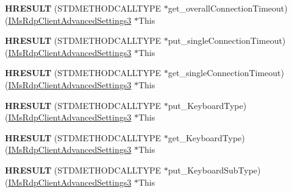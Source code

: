 \begin{DoxyCompactItemize}
{\bfseries H\+R\+E\+S\+U\+LT} (S\+T\+D\+M\+E\+T\+H\+O\+D\+C\+A\+L\+L\+T\+Y\+PE $\ast$get\+\_\+overall\+Connection\+Timeout)(\hyperlink{interface_m_s_t_s_c_lib_1_1_i_ms_rdp_client_advanced_settings3}{I\+Ms\+Rdp\+Client\+Advanced\+Settings3} $\ast$This
\item 
\mbox{\label{struct_m_s_t_s_c_lib_1_1_i_ms_rdp_client_advanced_settings3_vtbl_a3953cbb9226f6e5beeb0c7cfb40a96ec}} 
{\bfseries H\+R\+E\+S\+U\+LT} (S\+T\+D\+M\+E\+T\+H\+O\+D\+C\+A\+L\+L\+T\+Y\+PE $\ast$put\+\_\+single\+Connection\+Timeout)(\hyperlink{interface_m_s_t_s_c_lib_1_1_i_ms_rdp_client_advanced_settings3}{I\+Ms\+Rdp\+Client\+Advanced\+Settings3} $\ast$This
\item 
\mbox{\label{struct_m_s_t_s_c_lib_1_1_i_ms_rdp_client_advanced_settings3_vtbl_a8e7351a4c42b0164b7c447efc75e3a94}} 
{\bfseries H\+R\+E\+S\+U\+LT} (S\+T\+D\+M\+E\+T\+H\+O\+D\+C\+A\+L\+L\+T\+Y\+PE $\ast$get\+\_\+single\+Connection\+Timeout)(\hyperlink{interface_m_s_t_s_c_lib_1_1_i_ms_rdp_client_advanced_settings3}{I\+Ms\+Rdp\+Client\+Advanced\+Settings3} $\ast$This
\item 
\mbox{\label{struct_m_s_t_s_c_lib_1_1_i_ms_rdp_client_advanced_settings3_vtbl_aec673bb68e19e9c6bf274cbc4f2cf01e}} 
{\bfseries H\+R\+E\+S\+U\+LT} (S\+T\+D\+M\+E\+T\+H\+O\+D\+C\+A\+L\+L\+T\+Y\+PE $\ast$put\+\_\+\+Keyboard\+Type)(\hyperlink{interface_m_s_t_s_c_lib_1_1_i_ms_rdp_client_advanced_settings3}{I\+Ms\+Rdp\+Client\+Advanced\+Settings3} $\ast$This
\item 
\mbox{\label{struct_m_s_t_s_c_lib_1_1_i_ms_rdp_client_advanced_settings3_vtbl_a1465f7f6dab69b1fe0597cb96c503d72}} 
{\bfseries H\+R\+E\+S\+U\+LT} (S\+T\+D\+M\+E\+T\+H\+O\+D\+C\+A\+L\+L\+T\+Y\+PE $\ast$get\+\_\+\+Keyboard\+Type)(\hyperlink{interface_m_s_t_s_c_lib_1_1_i_ms_rdp_client_advanced_settings3}{I\+Ms\+Rdp\+Client\+Advanced\+Settings3} $\ast$This
\item 
\mbox{\label{struct_m_s_t_s_c_lib_1_1_i_ms_rdp_client_advanced_settings3_vtbl_a288313db796863804247bc3fb1528e24}} 
{\bfseries H\+R\+E\+S\+U\+LT} (S\+T\+D\+M\+E\+T\+H\+O\+D\+C\+A\+L\+L\+T\+Y\+PE $\ast$put\+\_\+\+Keyboard\+Sub\+Type)(\hyperlink{interface_m_s_t_s_c_lib_1_1_i_ms_rdp_client_advanced_settings3}{I\+Ms\+Rdp\+Client\+Advanced\+Settings3} $\ast$This

\end{DoxyCompactItemize}
